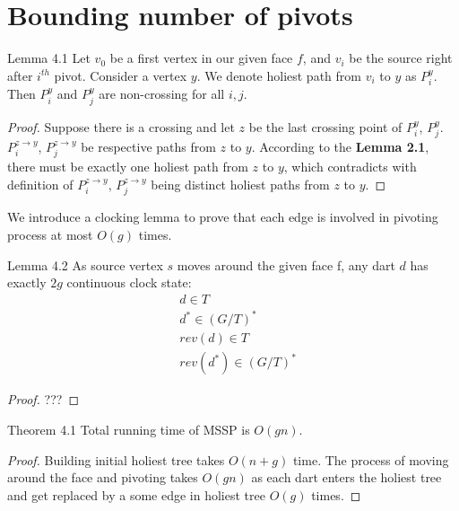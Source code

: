 \documentclass{article}
\begin{document}
\begin{figure}
\begin{subfigure}{.5\textwidth}
\end{subfigure}
\end{figure}

\newpage
\section{Bounding number of pivots}

\begin{oneshot}{Lemma 4.1}
Let $v_0$ be a first vertex in our given face $f$, and $v_i$ be the source right
after $i^{th}$ pivot. Consider a vertex $y$. We denote holiest path from 
$v_i$ to $y$ as $P_i^{y}$. Then $P_i^{y}$ and $P_j^{y}$ are non-crossing for 
all $i, j$.
\end{oneshot}
\begin{proof}
Suppose there is a crossing and let $z$ be the last crossing point of $P_i^{y}$, $P_j^{y}$. $P_i^{z \rightarrow y}$, $P_j^{z \rightarrow y}$ be respective paths from $z$ to $y$. According to the \textbf{Lemma 2.1}, there must be exactly one holiest path from $z$ to $y$, which contradicts with definition of $P_i^{z \rightarrow y}$, $P_j^{z \rightarrow y}$ being distinct holiest paths from $z$ to $y$.
\end{proof}

We introduce a clocking lemma to prove that each edge is involved in pivoting 
process at most $O(g)$ times.

\begin{oneshot}{Lemma 4.2}
As source vertex $s$ moves around the given face f, any dart $d$ has exactly
$2g$ continuous clock state: 
\begin{align*}
& d \in T \\
& d^{*} \in (G/T)^{*} \\
& rev(d) \in T \\
& rev(d^{*}) \in (G/T)^{*}
\end{align*}
\end{oneshot}
\begin{proof}
{\color{red}???}
\end{proof}


\begin{oneshot}{Theorem 4.1}
Total running time of MSSP is $O(gn)$.
\end{oneshot}
\begin{proof}
Building initial holiest tree takes $O(n + g)$ time. The process of moving around the
face and pivoting takes $O(gn)$ as each dart enters the holiest tree and get replaced by a some edge in holiest tree $O(g)$ times.
\end{proof}
\end{document}
